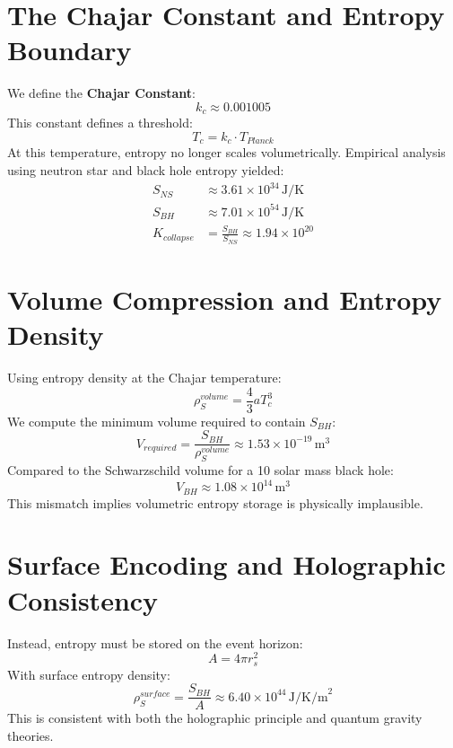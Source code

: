\documentclass[12pt]{article}
\begin{document}
\section{The Chajar Constant and Entropy Boundary}
We define the \textbf{Chajar Constant}:
\begin{equation}
\boxed{k_c \approx 0.001005}
\end{equation}
This constant defines a threshold:
\begin{equation}
T_c = k_c \cdot T_{Planck}
\end{equation}
At this temperature, entropy no longer scales volumetrically. Empirical analysis using neutron star and black hole entropy yielded:
\begin{align}
S_{NS} &\approx 3.61 \times 10^{34} \, \text{J/K} \\
S_{BH} &\approx 7.01 \times 10^{54} \, \text{J/K} \\
K_{collapse} &= \frac{S_{BH}}{S_{NS}} \approx 1.94 \times 10^{20}
\end{align}

\section{Volume Compression and Entropy Density}
Using entropy density at the Chajar temperature:
\begin{equation}
\rho_S^{volume} = \frac{4}{3} a T_c^3
\end{equation}
We compute the minimum volume required to contain $S_{BH}$:
\begin{equation}
V_{required} = \frac{S_{BH}}{\rho_S^{volume}} \approx 1.53 \times 10^{-19} \, \text{m}^3
\end{equation}
Compared to the Schwarzschild volume for a 10 solar mass black hole:
\begin{equation}
V_{BH} \approx 1.08 \times 10^{14} \, \text{m}^3
\end{equation}
This mismatch implies volumetric entropy storage is physically implausible.

\section{Surface Encoding and Holographic Consistency}
Instead, entropy must be stored on the event horizon:
\begin{equation}
A = 4\pi r_s^2
\end{equation}
With surface entropy density:
\begin{equation}
\rho_S^{surface} = \frac{S_{BH}}{A} \approx 6.40 \times 10^{44} \, \text{J/K/m}^2
\end{equation}
This is consistent with both the holographic principle and quantum gravity theories.
\end{document}
